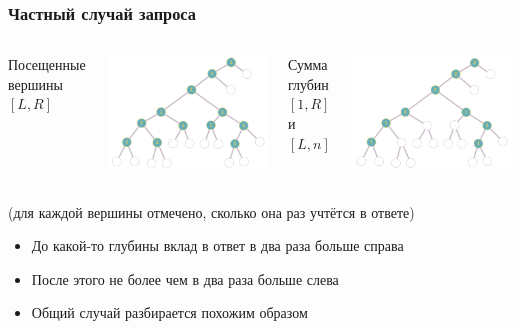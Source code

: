 \documentclass{beamer}
\begin{document}
\begin{frame}
\frametitle{Частный случай запроса}

\begin{columns}
Посещенные вершины $[L, R]$

\includegraphics[scale=0.13]{segtree_old.png}

Сумма глубин $[1, R]$ и $[L, n]$

\includegraphics[scale=0.13]{segtree_depth.png}
\end{columns}

\small{(для каждой вершины отмечено, сколько она раз учтётся в ответе)}

\begin{itemize}
\item До какой-то глубины вклад в ответ в два раза больше справа
\item После этого не более чем в два раза больше слева
\item Общий случай разбирается похожим образом
\end{itemize}

\end{frame}
\end{document}
